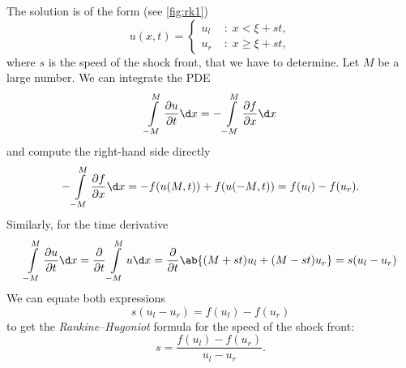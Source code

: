 \documentclass[justified, nobib, a4page]{tufte-handout}
\begin{document}
The solution is of the form (see \cref{fig:rk1})
\[
	u(x,t) = \left\{
	\begin{aligned}
		u_l \; & : \; x < \xi + st,    \\
		u_r \; & : \; x \geq \xi + st,
	\end{aligned} \right.
\]
where \(s\) is the speed of the shock front, that we have to determine. Let \(M\) be a large number.
We can integrate the PDE
\[
	\int\limits_{-M}^{M} \pdv{u}{t} \d x = -  \int\limits_{-M}^{M} \pdv{f}{x} \d x
\]
and compute the right-hand side directly
\[
	- \int\limits_{-M}^{M} \pdv{f}{x} \d x  = -f(u(M, t)) + f(u(-M, t)) = f(u_l) - f(u_r).
\]
Similarly, for the time derivative
\[
	\int\limits_{-M}^{M} \pdv{u}{t} \d x
	= \pdv{}{t}\int\limits_{-M}^{M} u \d x
	= \pdv{}{t}\ab\{ (M+st)u_l + (M-st)u_r \} = s(u_l - u_r)
\]
We can equate both expressions
\[
	s(u_l - u_r) = f(u_l) - f(u_r)
\]
to get the \emph{Rankine--Hugoniot} formula for the speed of the shock front:
\[
	s = \frac{f(u_l) - f(u_r)}{u_l - u_r}.
\]

% 
\end{document}
